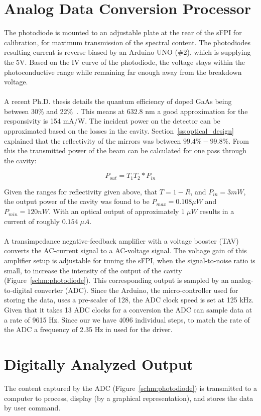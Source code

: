 \documentclass[12pt,journal]{IEEEtran}
\begin{document}
\section{Analog Data Conversion Processor}\label{processor}
The photodiode is mounted to an adjustable plate at the rear of the sFPI for calibration, for maximum transmission of the spectral content. The photodiodes resulting current is reverse biased by an Arduino UNO (\#2), which is supplying the 5V. Based on the IV curve of the photodiode, the voltage stays within the photoconductive range while remaining far enough away from the breakdown voltage. 
\\\\
A recent Ph.D. thesis details the quantum efficiency of doped GaAs being between 30\% and 22\%~\cite{responsivity}. This means at 632.8 nm a good approximation for the responsivity is 154 mA/W. The incident power on the detector can be approximated based on the losses in the cavity. Section~\ref{ss:optical_design} explained that the reflectivity of the mirrors was between $99.4\% - 99.8\%$. From this the transmitted power of the beam can be calculated for one pass through the cavity:

\begin{equation}
P_{out} = T_1T_2*P_{in}
\end{equation}

Given the ranges for reflectivity given above, that $T = 1-R$, and $P_{in} = 3 mW$, the output power of the cavity was found to be $P_{max} = 0.108 \mu W$ and $P_{min} = 120 nW$. With an optical output of approximately $1\;\mu W$ results in a current of roughly $0.154\;\mu A$.  
\\\\
A transimpedance negative-feedback amplifier with a voltage booster (TAV) converts the AC-current signal to a AC-voltage signal. The voltage gain of this amplifier setup is adjustable for tuning the sFPI, when the signal-to-noise ratio is small, to increase the intensity of the output of the cavity (Figure~\ref{schm:photodiode}). This corresponding output is sampled by an analog-to-digital converter (ADC). Since the Arduino, the micro-controller used for storing the data, uses a pre-scaler of 128, the ADC clock speed is set at 125 kHz. Given that it takes 13 ADC clocks for a conversion the ADC can sample data at a rate of 9615 Hz. Since our we have 4096 individual steps, to match the rate of the ADC a frequency of 2.35 Hz in used for the driver.    

\section{Digitally Analyzed Output}\label{digital-output}
The content captured by the ADC (Figure~\ref{schm:photodiode}) is transmitted to a computer to process, display (by a graphical representation), and stores the data by user command.  
\end{document}
